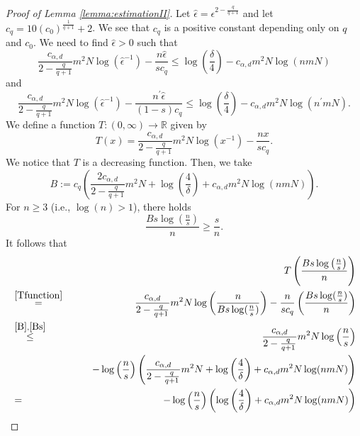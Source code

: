 \documentclass[10pt,a4paper]{amsart}
\def\RR{\mathbb R}
\begin{document}
\begin{proof}[Proof of Lemma \ref{lemma:estimationII}]
Let $\hat \epsilon = \epsilon^{2-{\frac{q}{q+1}}}$ and let $c_q = 10 (c_0)^{\frac{1}{q+1}} +2$. We see that $c_q$ is a positive constant depending only on $q$ and $c_0$. We need to find $\hat \epsilon>0$ such that 
\begin{equation}\label{firstinq}
    \frac{c_{\alpha, d}}{2-{\frac{q}{q+1}}} m^2 N \log (\hat \epsilon^{-1}) - \frac{n\hat \epsilon }{s c_{q}}  \leq \log \left(\frac{\delta}{4}\right) -  c_{\alpha, d} m^2 N \log(nmN)    
\end{equation}
and 
\begin{equation}\label{secondinq}
    \frac{c_{\alpha, d}}{2-{\frac{q}{q+1}}} m^2 N \log (\hat \epsilon^{-1}) - \frac{n^\prime \hat \epsilon }{(1-s) c_{q}}  \leq \log \left(\frac{\delta}{4}\right) -  c_{\alpha, d} m^2 N \log(n^\prime mN).    
\end{equation}
We define a function $T:(0, \infty) \to \RR$ given by 
\begin{equation}\label{Tfunction}
     T(x) = \frac{c_{\alpha, d}}{2-{\frac{q}{q+1}}} m^2 N \log (x^{-1}) - \frac{nx }{sc_{q}}.
\end{equation}     
We notice that $T$ is a decreasing function. Then, we take
\begin{equation}\label{B}
    B:=c_{q} \left(\frac{2c_{\alpha, d}}{2-{\frac{q}{q+1}}} m^2 N + \log \left(\frac{4}{\delta}\right) + c_{\alpha, d} m^2 N\log(nmN)\right).  
\end{equation}
For $n \geq 3$ (i.e., $\log (n) >1$), there holds 
\begin{equation}\label{Bs}
    \frac{B s\log \left(\frac{n}{s}\right)}{n}
 \geq \frac{s}{n}.
\end{equation}
It follows that  
\begin{eqnarray*}
   && T\left( \frac{Bs\log \left(\frac{n}{s}\right)}{n}
\right)\\
   &\stackrel{\eqref{Tfunction}}{=}& \frac{c_{\alpha, d}}{2-{\frac{q}{q+1}}} m^2 N \log \left(\frac{n}{Bs\log (\frac{n}{s})}\right) - \frac{n}{sc_{q}}\left(\frac{Bs\log (\frac{n}{s})}{n}\right)\\
   &\stackrel{\eqref{B}, \eqref{Bs}}{\leq}& \frac{c_{\alpha, d}}{2-{\frac{q}{q+1}}} m^2 N \log \left(\frac{n}{s}\right)\\
   &&\qquad- \log \left(\frac{n}{s}\right)\left(\frac{c_{\alpha, d}}{2-{\frac{q}{q+1}}} m^2 N + \log \left(\frac{4}{\delta}\right) + c_{\alpha, d} m^2 N \log(nmN)\right)\\
   &=&  - \log \left(\frac{n}{s}\right) \left(\log \left(\frac{4}{\delta}\right) + c_{\alpha, d} m^2 N \log(nmN)\right)\\

\end{eqnarray*}
\end{proof}
\end{document}
